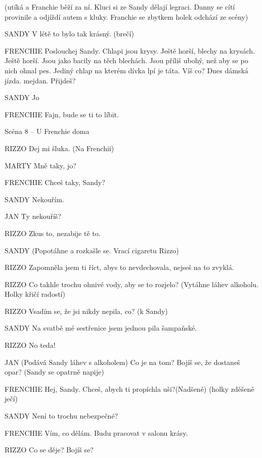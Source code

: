         (utíká a Franchie běží za ní. Kluci si ze Sandy dělají legraci. Danny se cítí         provinile a odjíždí autem s kluky. Franchie se zbytkem holek odchází ze scény) 

SANDY        V létě to bylo tak krásný. (brečí)

FRENCHIE         Poslouchej Sandy. Chlapi jsou krysy. Ještě horší, blechy na krysách.                 Ještě horší. Jsou jako bacily na těch blechách. Jsou příliš ubohý, než aby         se po nich ohnal pes. Jediný chlap na kterém dívka lpí je táta. Víš co?         Dnes dámská jízda. mejdan. Přijdeš?

SANDY        Jo

FRENCHIE         Fajn, bude se ti to líbit. 

Scéna 8 – U Frenchie doma 

RIZZO                Dej mi šluka. (Na Frenchii)

MARTY                Mně taky, jo? 

FRENCHIE                Chceš taky, Sandy?

SANDY                Nekouřím.

JAN                Ty nekouříš?

RIZZO                Zkus to, nezabije tě to.

SANDY                (Popotáhne a rozkašle se. Vrací cigaretu Rizzo)

RIZZO                Zapomněla jsem ti říct, abys to nevdechovala, nejseš na to zvyklá.

RIZZO                Co takhle trochu ohnivé vody, aby se to rozjelo? (Vytáhne                                 láhev alkoholu. Holky křičí radostí)

RIZZO                Vsadím se, že jsi nikdy nepila, co? (k Sandy)

SANDY                Na svatbě mé sestřenice jsem jednou pila šampaňské.

RIZZO                No teda!

JAN                (Podává Sandy láhev s alkoholem) Co je na tom? Bojíš se, že dostaneš                 opar? (Sandy se opatrně napije)

FRENCHIE        Hej, Sandy. Chceš, abych ti propíchla uši?(Nadšeně) (holky zděšeně ječí) 

SANDY        Není to trochu nebezpečné?

FRENCHIE        Vím, co dělám. Budu pracovat v salonu krásy.

RIZZO        Co se děje? Bojíš se?

